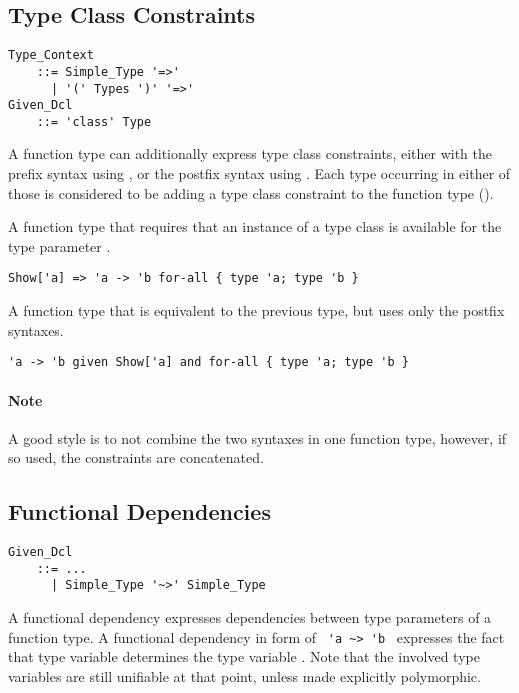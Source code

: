 \subsection{Type Class Constraints}

\grammar\begin{lstlisting}
Type_Context 
    ::= Simple_Type '=>'
      | '(' Types ')' '=>'
Given_Dcl
    ::= 'class' Type
\end{lstlisting}

A function type can additionally express type class constraints, either with the prefix syntax using , or the postfix syntax using . Each type occurring in either of those is considered to be adding a type class constraint to the function type (). 

\example A function type that requires that an instance of a type class  is available for the type parameter .
\begin{lstlisting}
Show['a] => 'a -> 'b for-all { type 'a; type 'b }
\end{lstlisting}

\example A function type that is equivalent to the previous type, but uses only the postfix syntaxes. 
\begin{lstlisting}
'a -> 'b given Show['a] and for-all { type 'a; type 'b }
\end{lstlisting}

\paragraph{Note}
A good style is to not combine the two syntaxes in one function type, however, if so used, the constraints are concatenated. 





\subsection{Functional Dependencies}

\grammar\begin{lstlisting}
Given_Dcl 
    ::= ...
      | Simple_Type '~>' Simple_Type
\end{lstlisting}

A functional dependency expresses dependencies between type parameters of a function type. A functional dependency in form of ~\lstinline!'a ~> 'b!~ expresses the fact that type variable  determines the type variable . Note that the involved type variables are still unifiable at that point, unless made explicitly polymorphic. 





